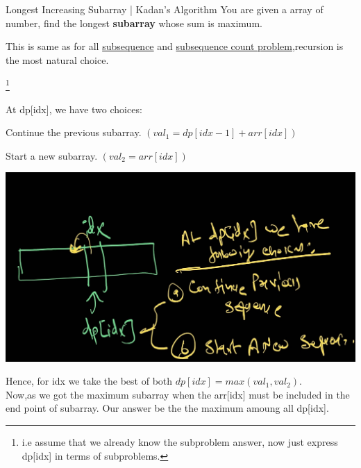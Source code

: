 
\begin{problem}[Question:]{Longest Increasing Subarray | Kadan's Algorithm}
    You are given a array of number, find the longest \textbf{subarray} whose sum is maximum.
\end{problem}

\begin{solution}[Naive]
    This is same as for all \underline{subsequence} and \underline{subsequence count problem},recursion is the most natural choice.

    \medskip
    \footnote{i.e assume that we already know the subproblem answer, now just express dp[idx] in terms of subproblems.}
    
    \medskip
    At dp[idx], we have two choices:
    \begin{asparaenum}[(a)]
        \item \indent Continue the previous subarray. $(val_1 = dp[idx-1]+arr[idx])$
        \item Start a new subarray. $(val_2 = arr[idx])$
    \end{asparaenum}

    \begin{marginfigure}
        \includegraphics[width=\marginparwidth]{./resources/KadansChoices.jpg}
    \end{marginfigure}

    \medskip
    Hence, for idx we take the best of both $dp[idx] = max(val_1,val_2)$. \\[2mm]
    Now,as we got the maximum subarray when the arr[idx] must be included in the end point of subarray. Our answer be the the maximum amoung all dp[idx].



\end{solution}
